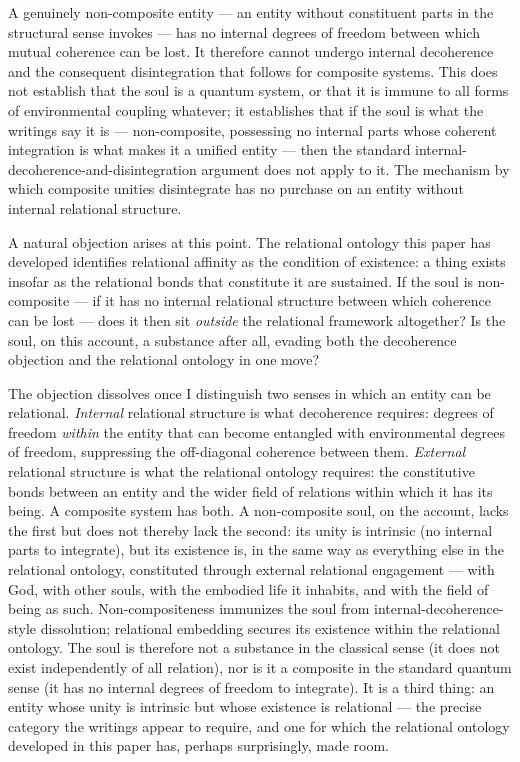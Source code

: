 A genuinely non-composite entity --- an entity without constituent
parts in the structural sense \AbdulBaha invokes --- has no internal
degrees of freedom between which mutual coherence can be lost.
It therefore cannot undergo internal decoherence and the consequent
disintegration that follows for composite systems.
This does not establish that the soul is a quantum system, or that
it is immune to all forms of environmental coupling whatever; it
establishes that if the soul is what the \bahai writings say it is
--- non-composite, possessing no internal parts whose coherent
integration is what makes it a unified entity --- then the standard
internal-decoherence-and-disintegration argument does not apply to it.
The mechanism by which composite unities disintegrate has no purchase
on an entity without internal relational structure.

A natural objection arises at this point.
The relational ontology this paper has developed identifies relational
affinity as the condition of existence: a thing exists insofar as the
relational bonds that constitute it are sustained.
If the soul is non-composite --- if it has no internal relational
structure between which coherence can be lost --- does it then sit
\emph{outside} the relational framework altogether?
Is the soul, on this account, a substance after all, evading both the
decoherence objection and the relational ontology in one move?

The objection dissolves once I distinguish two senses in which an
entity can be relational.
\emph{Internal} relational structure is what decoherence requires:
degrees of freedom \emph{within} the entity that can become entangled
with environmental degrees of freedom, suppressing the off-diagonal
coherence between them.
\emph{External} relational structure is what the relational ontology
requires: the constitutive bonds between an entity and the wider field
of relations within which it has its being.
A composite system has both.
A non-composite soul, on the \bahai account, lacks the first but does
not thereby lack the second: its unity is intrinsic (no internal parts
to integrate), but its existence is, in the same way as everything else
in the relational ontology, constituted through external relational
engagement --- with God, with other souls, with the embodied life it
inhabits, and with the field of being as such.
Non-compositeness immunizes the soul from internal-decoherence-style
dissolution; relational embedding secures its existence within the
relational ontology.
The soul is therefore not a substance in the classical sense (it does
not exist independently of all relation), nor is it a composite in the
standard quantum sense (it has no internal degrees of freedom to
integrate).
It is a third thing: an entity whose unity is intrinsic but whose
existence is relational --- the precise category the \bahai writings
appear to require, and one for which the relational ontology
developed in this paper has, perhaps surprisingly, made room.


